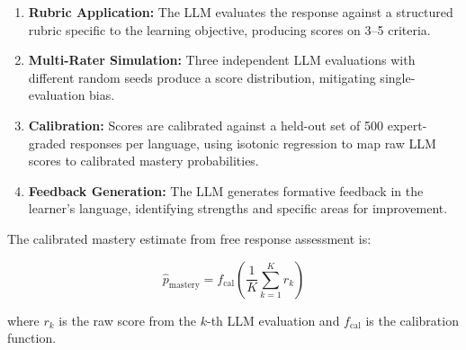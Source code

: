 \begin{enumerate}[leftmargin=*]
    \item \textbf{Rubric Application:} The LLM evaluates the response against a structured rubric specific to the learning objective, producing scores on 3--5 criteria.
    \item \textbf{Multi-Rater Simulation:} Three independent LLM evaluations with different random seeds produce a score distribution, mitigating single-evaluation bias.
    \item \textbf{Calibration:} Scores are calibrated against a held-out set of 500 expert-graded responses per language, using isotonic regression to map raw LLM scores to calibrated mastery probabilities.
    \item \textbf{Feedback Generation:} The LLM generates formative feedback in the learner's language, identifying strengths and specific areas for improvement.
\end{enumerate}

The calibrated mastery estimate from free response assessment is:

\begin{equation}
    \hat{p}_{\text{mastery}} = f_{\text{cal}}\left(\frac{1}{K}\sum_{k=1}^{K} r_k\right)
\end{equation}

\noindent where $r_k$ is the raw score from the $k$-th LLM evaluation and $f_{\text{cal}}$ is the calibration function.

